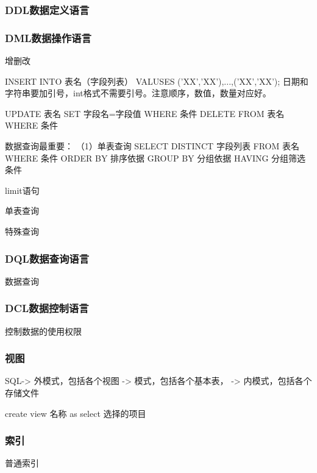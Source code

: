 \documentclass[UTF8]{article}
\begin{document}
\subsubsection{DDL数据定义语言}
    
    \begin{comment}
    CREATE TABLE 创建表
    DROP TABLE 删除表
    ALTER TABLE 修改表+( ADD 字段名 类型, MODIFY 字段名 新字段名 新字段类型, DROP 待删除字段, RENAME TO 表的新名字)
    TRUNCATE TABLE 清空表
    DESCRIBE 查看表结构
    建立主键、外键等约束(PRIMARY KEY, NOT NULL, UNIQUE, DEFAULT '男', AUTO_INCREMENT)
    UNIQUE 意思是不能有重复的。
    \end{comment}

\subsubsection{DML数据操作语言}
增删改

INSERT INTO 表名（字段列表） VALUSES ('XX','XX'),...,('XX','XX'); 日期和字符串要加引号，int格式不需要引号。注意顺序，数值，数量对应好。

UPDATE 表名 SET 字段名=字段值 WHERE 条件
DELETE FROM 表名 WHERE 条件

数据查询最重要：
（1）单表查询
SELECT DISTINCT 字段列表 FROM 表名 WHERE 条件
ORDER BY 排序依据
GROUP BY 分组依据
HAVING 分组筛选条件

limit语句

单表查询

特殊查询

\subsubsection{DQL数据查询语言}
数据查询

\subsubsection{DCL数据控制语言}
控制数据的使用权限



\subsubsection{视图}
SQL-> 外模式，包括各个视图 -> 模式，包括各个基本表， -> 内模式，包括各个存储文件

create view 名称 as select 选择的项目




\subsubsection{索引}
普通索引
\end{document}
